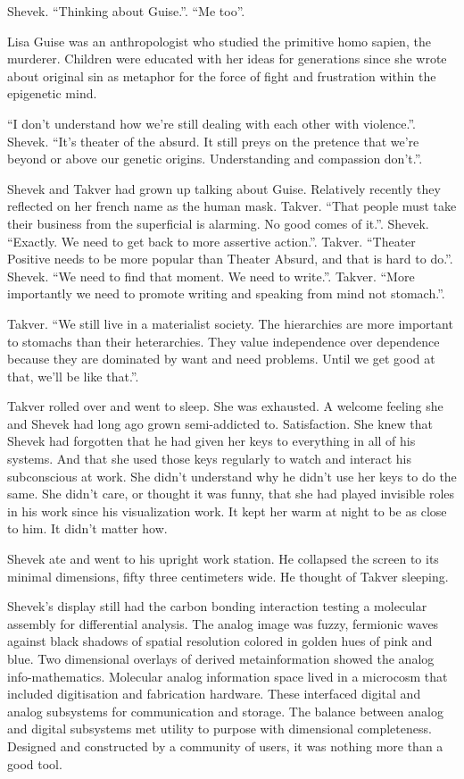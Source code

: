 Shevek.  ``Thinking about Guise.''.  ``Me too''.

Lisa Guise was an anthropologist who studied the primitive homo
sapien, the murderer.  Children were educated with her ideas for
generations since she wrote about original sin as metaphor for the
force of fight and frustration within the epigenetic mind.

``I don't understand how we're still dealing with each other with
violence.''.  Shevek.  ``It's theater of the absurd.  It still preys
on the pretence that we're beyond or above our genetic origins.
Understanding and compassion don't.''.

Shevek and Takver had grown up talking about Guise.  Relatively
recently they reflected on her french name as the human mask.  Takver.
``That people must take their business from the superficial is
alarming.  No good comes of it.''.  Shevek.  ``Exactly.  We need to
get back to more assertive action.''.  Takver.  ``Theater Positive
needs to be more popular than Theater Absurd, and that is hard to
do.''.  Shevek.  ``We need to find that moment.  We need to write.''.
Takver.  ``More importantly we need to promote writing and speaking
from mind not stomach.''.

Takver.  ``We still live in a materialist society.  The hierarchies
are more important to stomachs than their heterarchies.  They value
independence over dependence because they are dominated by want and
need problems.  Until we get good at that, we'll be like that.''.

Takver rolled over and went to sleep.  She was exhausted.  A welcome
feeling she and Shevek had long ago grown semi-addicted to.
Satisfaction.  She knew that Shevek had forgotten that he had given
her keys to everything in all of his systems.  And that she used those
keys regularly to watch and interact his subconscious at work.  She
didn't understand why he didn't use her keys to do the same.  She
didn't care, or thought it was funny, that she had played invisible
roles in his work since his visualization work.  It kept her warm at
night to be as close to him.  It didn't matter how.

Shevek ate and went to his upright work station.  He collapsed the
screen to its minimal dimensions, fifty three centimeters wide.  He
thought of Takver sleeping.

Shevek's display still had the carbon bonding interaction testing a
molecular assembly for differential analysis.  The analog image was
fuzzy, fermionic waves against black shadows of spatial resolution
colored in golden hues of pink and blue.  Two dimensional overlays of
derived metainformation showed the analog info-mathematics.  Molecular
analog information space lived in a microcosm that included
digitisation and fabrication hardware.  These interfaced digital and
analog subsystems for communication and storage.  The balance between
analog and digital subsystems met utility to purpose with dimensional
completeness.  Designed and constructed by a community of users, it
was nothing more than a good tool.

